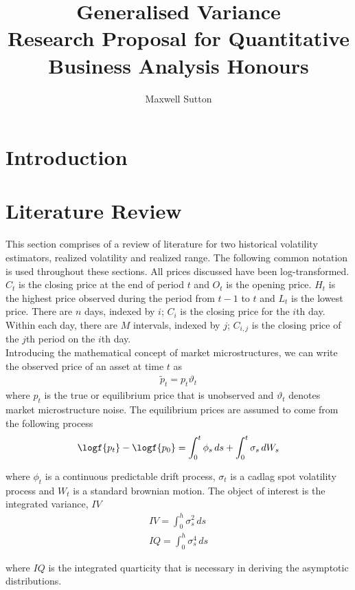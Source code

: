 \documentclass[12pt]{article}
\author{Maxwell Sutton}
\title{Generalised Variance  \\ {\large Research Proposal for Quantitative Business Analysis Honours}}
\begin{document}
\maketitle

\section{Introduction}
\clearpage
\section{Literature Review}

This section comprises of a review of literature for two historical volatility estimators, realized volatility
and realized range. The following common notation is used throughout these sections. All prices discussed have
been log-transformed. $C_t$ is the closing price at the end of period $t$ and $O_t$ is the opening
price. $H_t$ is the highest price observed during the period from $t-1$ to $t$ and $L_t$ is the lowest
price. There are $n$ days, indexed by $i$; $C_i$ is the closing price for the $i$th day. Within each day,
there are $M$ intervals, indexed by $j$; $C_{i,j}$ is the closing price of the $j$th period on the $i$th day. \\

Introducing the mathematical concept of market microstructures, we can write the observed price of an asset at
time $t$ as
\begin{align*}
  \tilde{p}_{t} = p_{t} \vartheta_{t} 
\end{align*}
where $p_t$ is the true or equilibrium price that is unobserved and $\vartheta_t$ denotes market
microstructure noise. The equilibrium prices are assumed to come from the following process
\begin{align*}
  \logf{p_t} - \logf{p_0} = \int_{0}^t \phi_s \,ds + \int_0^t \sigma_s \, dW_s
\end{align*}

where $\phi_t$ is a continuous predictable drift process, $\sigma_t$ is a cadlag spot volatility process and
$W_t$ is a standard brownian motion. The object of interest is the integrated variance, $IV$
\begin{align*}
  IV = \int_0^h \sigma_s^2 \, ds \\
  IQ = \int_0^h \sigma_s^4 \, ds
\end{align*}

where $IQ$ is the integrated quarticity that is necessary in deriving the asymptotic distributions.
\end{document}
